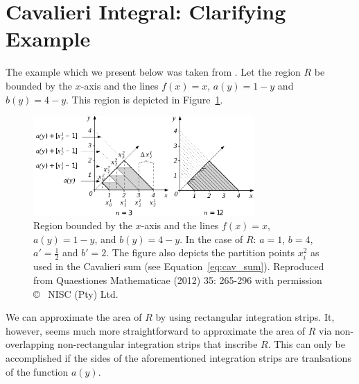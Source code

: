 \documentclass[twoside,reqno,11pt]{fcaa-var} %
\begin{document}
\section{Cavalieri Integral: Clarifying Example}
\label{sec:cav_integral_example}
\noindent
The example which we present below was taken from \cite{ackermann12,grobler19}. Let the region $R$ be bounded by the $x$-axis and the lines $f(x)=x$, $a(y)=1-y$ and $b(y)=4-y$. This region is depicted in Figure~\ref{fig:caval2}.\\

\begin{figure}[htb]
\centering
\includegraphics[width=0.75\textwidth]{fig13.pdf}
\caption{Region bounded by the $x$-axis and the lines $f(x)=x$, $a(y)=1-y$, and $b(y)=4-y$. In the case of $R$: $a=1$, $b=4$, $a'=\frac{1}{2}$ and $b'=2$. The figure also depicts the partition points $x_i^2$ as used in the Cavalieri sum (see Equation~\eqref{eq:cav_sum}). Reproduced from Quaestiones Mathematicae (2012) 35: 265-296 with permission \copyright~ NISC (Pty) Ltd.}
\label{fig:caval2}
\end{figure}


\noindent
We can approximate the area of $R$ by using rectangular integration strips. It, however, seems much more straightforward to approximate the area of $R$ via non-overlapping non-rectangular integration strips that inscribe $R$. This can only be accomplished if the sides of the aforementioned integration strips are tranlsations of the function $a(y)$.\\
\end{document}
